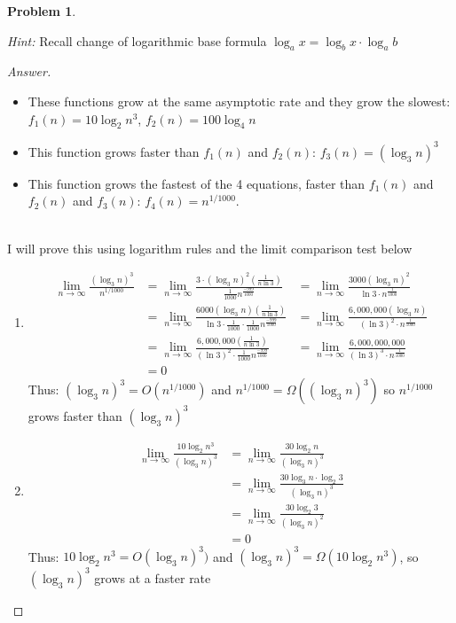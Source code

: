 \documentclass[11pt]{article}
\theoremstyle{definition}
\theoremstyle{definition}
\newtheorem{required}{Problem}
\theoremstyle{definition}
\begin{document}
\begin{required}
\begin{enumerate} [label=(\alph*)]
    \emph{Hint:} Recall change of logarithmic base formula $\log_a x = \log_b x\cdot\log_a b$
    \begin{proof}[Answer]

\begin{itemize}
\item These functions grow at the same asymptotic rate and they grow the slowest: $f_{1}(n)= 10 \log_2 n^3$, $f_{2}(n)= 100\log_4 n$
\item This function grows faster than $f_{1}(n)$ and $f_{2}(n)$:  $f_{3}(n)= (\log_3 n)^3 $
\item This function grows the fastest of the 4 equations, faster than $f_{1}(n)$ and $f_{2}(n)$ and $f_{3}(n)$: $f_{4}(n)=n^{1/1000}$.
\end{itemize}


\noindent \\ I will prove this using logarithm rules and the limit comparison test below
\begin{enumerate}

\item
\begin{align*}
\lim_{n \to \infty} \frac{(\log_3 n)^3}{n^{1/1000}} 
&= \lim_{n \to \infty} \frac{3\cdot(\log_3 n)^2 (\frac{1}{n\ln3})}{\frac{1}{1000}n^{\frac{-999}{1000}}}
&= \lim_{n \to \infty} \frac{3000(\log_3 n)^2}{\ln3\cdot n^{\frac{1}{1000}}} \\
&= \lim_{n \to \infty} \frac{6000(\log_3 n)(\frac{1}{n\ln3})}{\ln3\cdot{\frac{1}{1000}}\cdot \frac{1}{1000}n^{\frac{-999}{1000}}} 
&= \lim_{n \to \infty} \frac{6,000,000(\log_3 n)}{(\ln3)^2\cdot n^{\frac{1}{1000}}} \\
&= \lim_{n \to \infty} \frac{6,000,000(\frac{1}{n\ln3})}{(\ln3)^2\cdot \frac{1}{1000}n^{\frac{-999}{1000}}} 
&= \lim_{n \to \infty} \frac{6,000,000,000}{(\ln3)^3\cdot n^{\frac{1}{1000}}} \\
&=0
\end{align*}
Thus: $(\log_3 n)^3= O(n^{1/1000})$ and $n^{1/1000}= \Omega((\log_3 n)^3)$ so $n^{1/1000}$ grows faster than $(\log_3 n)^3$

\item
\begin{align*}
\lim_{n \to \infty} \frac{10 \log_2 n^3}{(\log_3 n)^3} &= \lim_{n \to \infty} \frac{30 \log_2 n}{(\log_3 n)^3} \\
&= \lim_{n \to \infty} \frac{30 \log_3 n\cdot \log_2 3}{(\log_3 n)^3} \\
&= \lim_{n \to \infty} \frac{30 \log_2 3}{(\log_3 n)^2} \\
&=0
\end{align*}
Thus: $10 \log_2 n^3 = O(\log_3 n)^3)$ and $(\log_3 n)^3 = \Omega(10 \log_2 n^3)$, so $(\log_3 n)^3$ grows at a faster rate


\end{enumerate}
\end{proof}
\end{enumerate}
\end{required}
\end{document}
